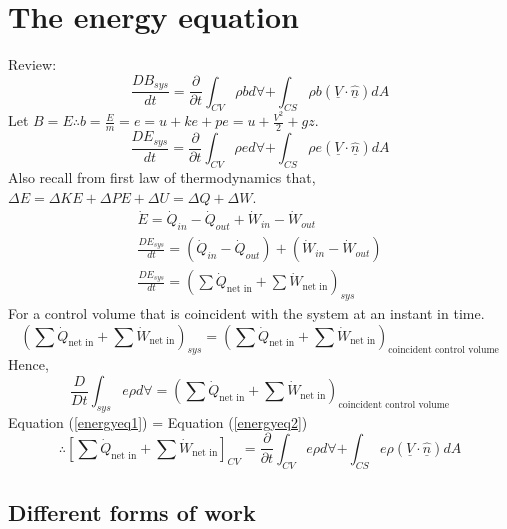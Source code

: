 \section{The energy equation}
Review:
\begin{equation}
  \frac{DB_{sys}}{dt} = \frac{\partial}{\partial t} \int_{CV} \rho b d \forall + \int_{CS} \rho b (\underline{V}\cdot \underline{\hat{n}}) dA
\end{equation}
Let $B=E \therefore b = \frac{E}{m} = e = u + ke + pe = u + \frac{V^2}{2} + gz$.
\begin{equation}
  \frac{DE_{sys}}{dt} = \frac{\partial}{\partial t} \int_{CV} \rho e d \forall + \int_{CS} \rho e (\underline{V}\cdot \underline{\hat{n}}) dA
\end{equation}
Also recall from first law of thermodynamics that, $\Delta E = \Delta KE + \Delta PE + \Delta U = \Delta Q + \Delta W$.
\begin{gather}
  \dot{E} = \dot{Q}_{in} - \dot{Q}_{out} + \dot{W}_{in} - \dot{W}_{out}\\
  \frac{DE_{sys}}{dt} = (\dot{Q}_{in} - \dot{Q}_{out}) + (\dot{W}_{in} - \dot{W}_{out})\\
  \frac{DE_{sys}}{dt} = \left( \sum \dot{Q}_{\textrm{net in}} + \sum \dot{W}_{\textrm{net in}} \right)_{sys} \label{energyeq1}
\end{gather}
For a control volume that is coincident with the system at an instant in time.
\begin{equation}
  \left( \sum \dot{Q}_{\textrm{net in}} + \sum \dot{W}_{\textrm{net in}} \right)_{sys} = \left( \sum \dot{Q}_{\textrm{net in}} + \sum \dot{W}_{\textrm{net in}} \right)_{\textrm{coincident control volume}}
\end{equation}
Hence,
\begin{equation}
  \frac{D}{Dt} \int_{sys} e \rho d \forall = \left( \sum \dot{Q}_{\textrm{net in}} + \sum \dot{W}_{\textrm{net in}} \right)_{\textrm{coincident control volume}} \label{energyeq2}
\end{equation}
Equation (\ref{energyeq1}) = Equation (\ref{energyeq2})
\begin{equation}
  \therefore \left[ \sum \dot{Q}_{\textrm{net in}} + \sum \dot{W}_{\textrm{net in}} \right]_{CV} = \frac{\partial}{\partial t} \int_{CV} e \rho d \forall + \int_{CS} e \rho (\underline{V} \cdot \underline{\hat{n}}) dA \label{energyeq3}
\end{equation}
\subsection{Different forms of work}
